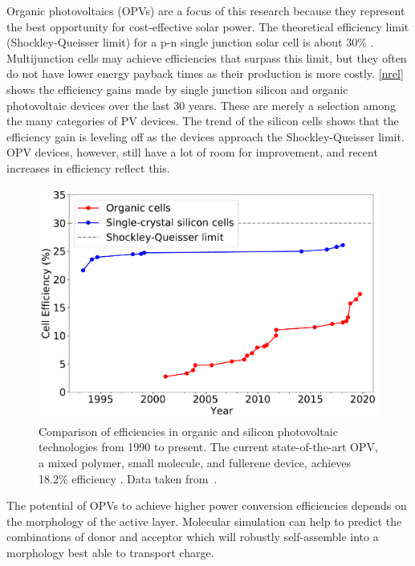 Organic photovoltaics (OPVs) are a focus of this research because they represent the best opportunity for cost-effective solar power.
The theoretical efficiency limit (Shockley-Queisser limit) for a p-n single junction solar cell is about 30\% \citep{Shockley1961}.
Multijunction cells may achieve efficiencies that surpass this limit, but they often do not have lower energy payback times as their production is more costly.
\autoref{nrel} shows the efficiency gains made by single junction silicon and organic photovoltaic devices over the last 30 years.
These are merely a selection among the many categories of PV devices.
The trend of the silicon cells shows that the efficiency gain is leveling off as the devices approach the Shockley-Queisser limit.
OPV devices, however, still have a lot of room for improvement, and recent increases in efficiency reflect this.
\begin{figure}[h!]
    \centering
    \includegraphics[width=0.8\linewidth]{figures/p3ht_val/NREL2020.pdf}
    \caption{Comparison of efficiencies in organic and silicon photovoltaic technologies from 1990 to present. The current state-of-the-art OPV, a mixed polymer, small molecule, and fullerene device, achieves 18.2\% efficiency \cite{Zhang2021}. Data taken from~\citet{NREL2020}.}\label{nrel}
\end{figure}
The potential of OPVs to achieve higher power conversion efficiencies depends on the morphology of the active layer. 
Molecular simulation can help to predict the combinations of donor and acceptor which will robustly self-assemble into a morphology best able to transport charge. 

